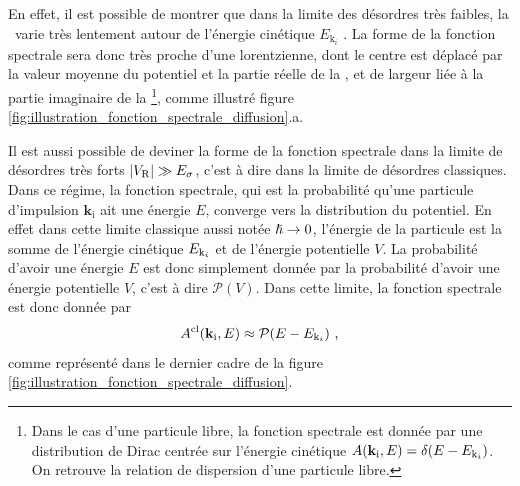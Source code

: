 En effet, il est possible de montrer que dans la limite des désordres très faibles, la \selfenergy\ varie très lentement autour de l'énergie cinétique $E_{\mathrm{k}_i}$ \citep{kuhn2007coherent}. La forme de la fonction spectrale sera donc très proche d'une lorentzienne, dont le centre est déplacé par la valeur moyenne du potentiel et la partie réelle de la \selfenergy , et de largeur liée à la partie imaginaire de la \selfenergy\footnote{Dans le cas d'une particule libre, la fonction spectrale est donnée par une distribution de Dirac centrée sur l'énergie cinétique $A(\mathbf{k}_{\mathrm{i}},E)=\delta(E-E_{\mathrm{k}_i})$. On retrouve la relation de dispersion d'une particule libre.}, comme illustré figure \ref{fig:illustration_fonction_spectrale_diffusion}.a. 


Il est aussi possible de deviner la forme de la fonction spectrale dans la limite de désordres très forts $|V_{\mathrm{R}}|\gg E_{\sigma}$, c'est à dire dans la limite de désordres classiques. Dans ce régime, la fonction spectrale, qui est la probabilité qu'une particule d'impulsion $\mathbf{k}_{\mathrm{i}}$ ait une énergie $E$, converge vers la distribution du potentiel. En effet dans cette limite classique aussi notée $\hslash\rightarrow 0$, l'énergie de la particule est la somme de l'énergie cinétique $E_{\mathrm{k}_i}$ et de l'énergie potentielle $V$. La probabilité d'avoir une énergie $E$ est donc simplement donnée par la probabilité d'avoir une énergie potentielle $V$, c'est à dire $\mathcal{P}(V)$. Dans cette limite, la fonction spectrale est donc donnée par \citep{trappe2015semiclassical}
\begin{equation}
A^{\mathrm{cl}}(\mathbf{k}_{\mathrm{i}},E)\approx \mathcal{P}(E-E_{\mathrm{k}_i}) \text{ ,}
\end{equation}
comme représenté dans le dernier cadre de la figure \ref{fig:illustration_fonction_spectrale_diffusion}. 


